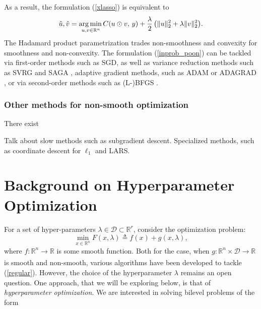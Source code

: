 \documentclass[11pt, twoside]{report}
\begin{document}
As a result, the formulation (\ref{xlasso}) is equivalent to 
\begin{equation} \label{inprob_poon}
    \hat{u},\hat{v} = \underset{u,v \in \mathbb{R}^{n}} {\operatorname*{arg\, min \,}}{C(u \odot v, \,y) + \frac \lambda 2 \left( \|u\|^2_2 + \lambda \|v\|^2_2 \right)}. 
\end{equation}
The Hadamard product parametrization trades non-smoothness and convexity for smoothness and non-convexity. The formulation (\ref{inprob_poon}) can be tackled via first-order methods such as SGD, as well as variance reduction methods such as SVRG and SAGA \cite{defazio2014saga, johnson2013accelerating}, adaptive gradient methods, such as ADAM or ADAGRAD \cite{kingma2014adam, gupta2014training}, or via second-order methods such as (L-)BFGS \cite{liu1989limited}.

\subsection{Other methods for non-smooth optimization}
There exist 
\begin{mdframed}[hidealllines=true,backgroundcolor=yellow!20]
    Talk about slow methods such as subgradient descent. Specialized methods, such as coordinate descent for $\ell_1$ and LARS.
\end{mdframed}

\chapter{Background on Hyperparameter Optimization}
For a set of hyper-parameters $\lambda \in \mathcal{D} \subset \mathbb{R}^r$, consider the optimization problem:
\begin{equation} \label{regular}
    \min _{x \in \mathbb{R}^n} F(x,\lambda) \triangleq f(x) + g(x,\lambda),
\end{equation}
where $f: \mathbb{R}^n \xrightarrow[]{} \mathbb{R}$ is some smooth function. Both for the case, when $g: \mathbb{R}^n \times \mathcal{D} \xrightarrow[]{} \mathbb{R}$ is smooth and non-smooth, various algorithms have been developed to tackle (\ref{regular}). However, the choice of the hyperparameter $\lambda$ remains an open question. One approach, that we will be exploring below, is that of \textit{hyperparameter optimization}. We are interested in solving bilevel problems of the form
\end{document}
